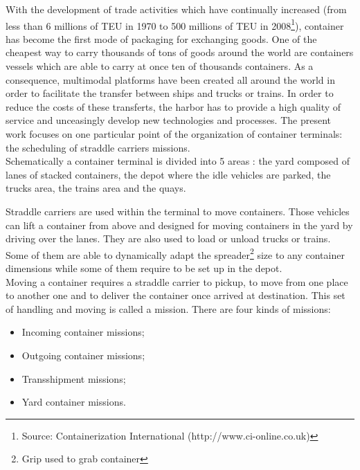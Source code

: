 \documentclass[review]{elsarticle}
\begin{document}
With the development of trade activities which have continually increased (from less than 6 millions of TEU in 1970 to 500 millions of TEU in 2008\footnote{Source: Containerization International (http://www.ci-online.co.uk)}), container has become the first mode of packaging for exchanging goods. One of the cheapest way to carry thousands of tons of goods around the world are containers vessels which are able to carry at once ten of thousands containers. As a consequence, multimodal platforms have been created all around the world in order to facilitate the transfer between ships and trucks or trains. In order to reduce the costs of these transferts, the harbor has to provide a high quality of service and unceasingly develop new technologies and processes. The present work focuses on one particular point of the organization of container terminals: the scheduling of straddle carriers missions.\\

Schematically a container terminal is divided into 5 areas : the yard composed of lanes of stacked containers, the depot where the idle vehicles are parked, the trucks area, the trains area and the quays.

Straddle carriers are used within the terminal to move containers. Those vehicles can lift a container from above and designed for moving containers in the yard by driving over the lanes. They are also used to load or unload trucks or trains. Some of them are able to dynamically adapt the spreader\footnote{Grip used to grab container} size to any container dimensions while some of them require to be set up in the depot.\\%


Moving a container requires a straddle carrier to pickup, to move from one place to another one and to deliver the container once arrived at destination. This set of handling and moving is called a mission. There are four kinds of missions:
\begin{itemize}
	\item Incoming container missions;
	\item Outgoing container missions;
	\item Transshipment missions;
	\item Yard container missions.
\end{itemize}
\end{document}
